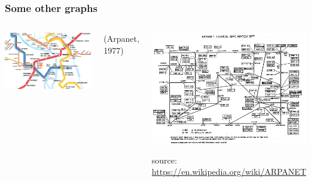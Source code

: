 \begin{frame}[fragile]\frametitle{Some other graphs}

\begin{columns}[t]

\begin{center}
\includegraphics[scale=0.3]{Figures/reseau_tisseo.png}
\end{center}

 (Arpanet, 1977)
\begin{center}
\includegraphics[scale=0.18]{Figures/arpanet_logical_map_1977.png}

\tiny{source: \url{https://en.wikipedia.org/wiki/ARPANET}}
\end{center}

\end{columns}

\end{frame}



